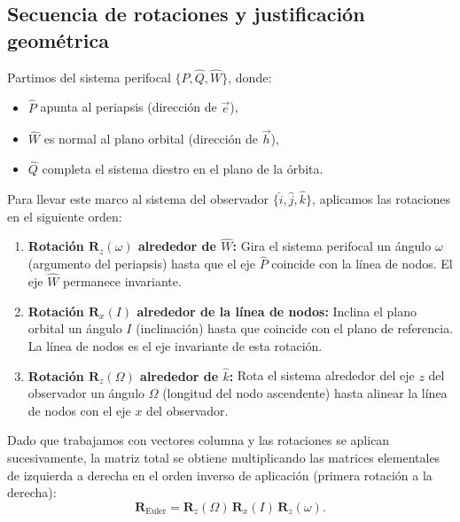 \subsection{Secuencia de rotaciones y justificación geométrica}
Partimos del sistema perifocal $\{ \hat{P}, \hat{Q}, \hat{W} \}$, donde:
\begin{itemize}
    \item $\hat{P}$ apunta al periapsis (dirección de $\vec{e}$),
    \item $\hat{W}$ es normal al plano orbital (dirección de $\vec{h}$),
    \item $\hat{Q}$ completa el sistema diestro en el plano de la órbita.
\end{itemize}
Para llevar este marco al sistema del observador $\{ \hat{i}, \hat{j}, \hat{k} \}$, aplicamos las rotaciones en el siguiente orden:
\begin{enumerate}
    \item \textbf{Rotación $\mathbf{R}_z(\omega)$ alrededor de $\hat{W}$:} Gira el sistema perifocal un ángulo $\omega$ (argumento del periapsis) hasta que el eje $\hat{P}$ coincide con la línea de nodos. El eje $\hat{W}$ permanece invariante.
    \item \textbf{Rotación $\mathbf{R}_x(I)$ alrededor de la línea de nodos:} Inclina el plano orbital un ángulo $I$ (inclinación) hasta que coincide con el plano de referencia. La línea de nodos es el eje invariante de esta rotación.
    \item \textbf{Rotación $\mathbf{R}_z(\Omega)$ alrededor de $\hat{k}$:} Rota el sistema alrededor del eje $z$ del observador un ángulo $\Omega$ (longitud del nodo ascendente) hasta alinear la línea de nodos con el eje $x$ del observador.
\end{enumerate}
Dado que trabajamos con vectores columna y las rotaciones se aplican sucesivamente, la matriz total se obtiene multiplicando las matrices elementales de izquierda a derecha en el orden inverso de aplicación (primera rotación a la derecha):
\[
\mathbf{R}_{\text{Euler}} = \mathbf{R}_z(\Omega)\,\mathbf{R}_x(I)\,\mathbf{R}_z(\omega).
\]

